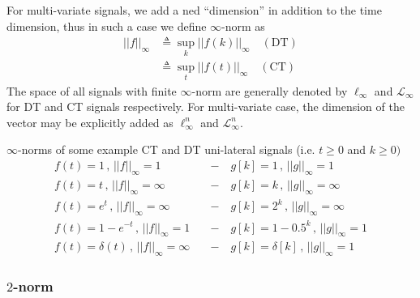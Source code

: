 \documentclass[twoside]{article}
\begin{document}
For multi-variate signals, we add a ned ``dimension'' in addition to the
time dimension, thus in such a case we define $\infty$-norm as
%
\begin{align*}
	|| f ||_{\infty} &\triangleq \underset{k}{\sup}|| f(k) ||_{\infty} \quad (\mathrm{DT})
	\\
	&\triangleq \underset{t}{\sup}|| f(t) ||_{\infty} \quad (\mathrm{CT})
\end{align*}
%
The space of all signals with finite $\infty$-norm are generally denoted by 
$\ell_{\infty}$ and $\mathcal{L}_{\infty}$ for DT and CT signals respectively.
For multi-variate case, the dimension of the vector may be explicitly added 
as $\ell^n_{\infty}$ and $\mathcal{L}^n_{\infty}$.

$\infty$-norms of some example CT and DT uni-lateral signals (i.e. $t \geq 0$
and $k \geq 0)$
%
\begin{align*}
	f(t) = 1 \, , \, || f ||_{\infty} = 1  \quad &- \quad g[k] = 1 \, , \, || g ||_{\infty} = 1
	\\
	f(t) = t \, , \, || f ||_{\infty} = \infty \quad &- \quad g[k] = k \, , \, || g ||_{\infty} = \infty
		\\
	f(t) = e^t \, , \, || f ||_{\infty} = \infty \quad &- \quad g[k] = 2^k \, , \, || g ||_{\infty} = \infty
			\\
	f(t) = 1 - e^{-t} \, , \, || f ||_{\infty} = 1 \quad &- \quad g[k] = 1 - 0.5^k \, , \, || g ||_{\infty} = 1
				\\
	f(t) = \delta(t) \, , \, || f ||_{\infty} = \infty \quad &- \quad g[k] = \delta[k] \, , \, || g ||_{\infty} = 1
\end{align*}

\subsubsection*{$2$-norm}
\end{document}
